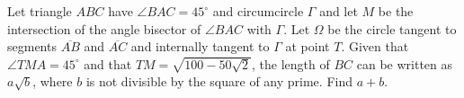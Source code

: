 Let triangle $ABC$ have $\angle BAC = 45^{\circ}$ and circumcircle $\Gamma$ and let $M$ be the intersection of the angle bisector of $\angle BAC$ with $\Gamma$. Let $\Omega$ be the circle tangent to segments $\overline{AB}$ and $\overline{AC}$ and internally tangent to $\Gamma$ at point $T$. Given that $\angle TMA = 45^{\circ}$ and that $TM = \sqrt{100 - 50 \sqrt{2}}$,  the length of $BC$ can be written as $a \sqrt{b}$,  where $b$ is not divisible by the square of any prime. Find $a + b$.